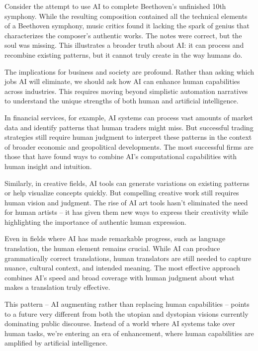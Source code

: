 \documentclass[
  Letterpaper,
]{scrbook}
\begin{document}
Consider the attempt to use AI to complete Beethoven's unfinished 10th
symphony. While the resulting composition contained all the technical
elements of a Beethoven symphony, music critics found it lacking the
spark of genius that characterizes the composer's authentic works. The
notes were correct, but the soul was missing. This illustrates a broader
truth about AI: it can process and recombine existing patterns, but it
cannot truly create in the way humans do.

The implications for business and society are profound. Rather than
asking which jobs AI will eliminate, we should ask how AI can enhance
human capabilities across industries. This requires moving beyond
simplistic automation narratives to understand the unique strengths of
both human and artificial intelligence.

In financial services, for example, AI systems can process vast amounts
of market data and identify patterns that human traders might miss. But
successful trading strategies still require human judgment to interpret
these patterns in the context of broader economic and geopolitical
developments. The most successful firms are those that have found ways
to combine AI's computational capabilities with human insight and
intuition.

Similarly, in creative fields, AI tools can generate variations on
existing patterns or help visualize concepts quickly. But compelling
creative work still requires human vision and judgment. The rise of AI
art tools hasn't eliminated the need for human artists -- it has given
them new ways to express their creativity while highlighting the
importance of authentic human expression.

Even in fields where AI has made remarkable progress, such as language
translation, the human element remains crucial. While AI can produce
grammatically correct translations, human translators are still needed
to capture nuance, cultural context, and intended meaning. The most
effective approach combines AI's speed and broad coverage with human
judgment about what makes a translation truly effective.

This pattern -- AI augmenting rather than replacing human capabilities
-- points to a future very different from both the utopian and dystopian
visions currently dominating public discourse. Instead of a world where
AI systems take over human tasks, we're entering an era of enhancement,
where human capabilities are amplified by artificial intelligence.
\end{document}
